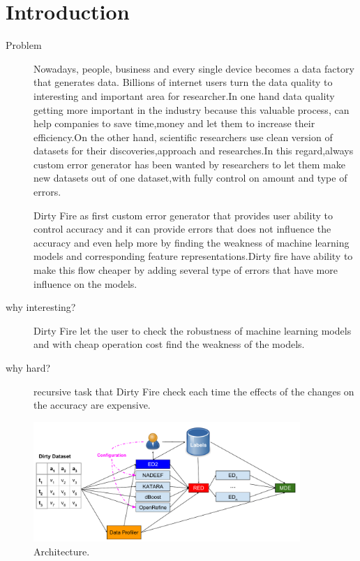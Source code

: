 \section{Introduction}

\begin{description}
\item[Problem]

Nowadays, people, business and every single device becomes a data factory that generates data. Billions of internet users turn the data quality to interesting and important area for researcher.In one hand data quality getting more important in the industry because this valuable process, can help companies to save time,money and let them to increase their efficiency.On the other hand, scientific researchers use clean version of datasets for their discoveries,approach and researches.In this regard,always custom error generator has been wanted by researchers to let them make new datasets out of one dataset,with fully control on amount and type of errors.


Dirty Fire as first custom error generator that provides user ability to control accuracy and it can provide errors that does not influence the accuracy and even help more by finding the weakness of machine learning models and corresponding feature representations.Dirty fire have ability to make this flow cheaper by adding several type of errors that have more influence on the models.



\item[why interesting?] 
Dirty Fire let the user to check the robustness of machine learning models and with cheap operation cost find the weakness of the models.
\item[why hard?]
recursive task that Dirty Fire check each time the effects of the changes on the accuracy are expensive. 


\end{description}

\begin{figure}[ht!]
	\centering
	\includegraphics[width=0.9\textwidth]{img/demo.pdf}
	\caption{Architecture.}
	\label{figure:architecture}
\end{figure}
